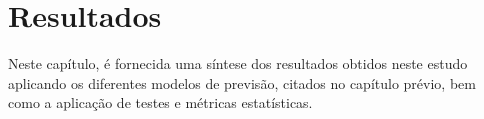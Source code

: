 \section{Resultados} \label{sec:result}

Neste capítulo, é fornecida uma síntese dos resultados obtidos neste estudo aplicando os diferentes modelos de previsão, citados no capítulo prévio, bem como a aplicação de testes e métricas estatísticas. 







